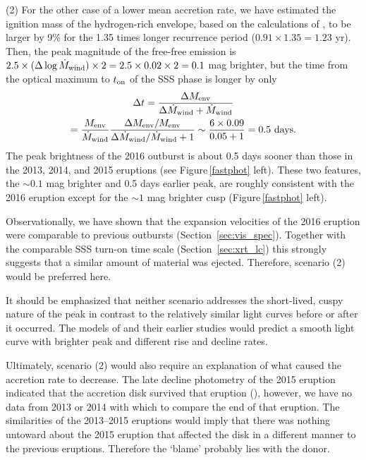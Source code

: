 \documentclass[twocolumn,tighten]{aastex6}
\newcommand{\hstphot}{\citetalias{2017ApJ...849...96D}}
\begin{document}
(2) For the other case of a lower mean accretion rate, we have estimated the ignition mass of the hydrogen-rich envelope, based on the calculations of \citet{2016ApJ...830...40K, 2017ApJ...838..153K}, to be larger by 9\% for the 1.35 times longer recurrence period ($0.91\times 1.35=1.23$ yr). Then, the peak magnitude of the free-free emission is $2.5 \times (\Delta \log \dot M_{\rm wind}) \times 2 = 2.5\times 0.02\times 2 = 0.1$ mag brighter, but the time from the optical maximum to $t_{\rm on}$ of the SSS phase is longer by only
\begin{multline*}
\Delta t = \frac{\Delta M_{\rm env}} { \Delta \dot M_{\rm wind} + \dot M_{\rm wind}}\\
= \frac{M_{\rm env}}{\dot M_{\rm wind}} \frac{\Delta M_{\rm env}/M_{\rm env}}{\Delta \dot M_{\rm wind}/ \dot M_{\rm wind} + 1} \sim \frac{6 \times 0.09}{0.05+1}=0.5 \text{ days}.
\end{multline*}
\noindent The peak brightness of the 2016 outburst is about 0.5 days sooner than those in the 2013, 2014, and 2015 eruptions (see Figure\,\ref{fastphot} left).  These two features, the $\sim 0.1$ mag brighter and 0.5 days earlier peak, are roughly consistent with the 2016 eruption except for the $\sim 1$ mag brighter cusp (Figure\,\ref{fastphot} left).

Observationally, we have shown that the expansion velocities of the 2016 eruption were comparable to previous outbursts (Section~\ref{sec:vis_spec}). Together with the comparable SSS turn-on time scale (Section~\ref{sec:xrt_lc}) this strongly suggests that a similar amount of material was ejected. Therefore, scenario (2) would be preferred here.

It should be emphasized that neither scenario addresses the short-lived, cuspy nature of the peak in contrast to the relatively similar light curves before or after it occurred. The models of \citet{2017ApJ...838..153K} and their earlier studies would predict a smooth light curve with brighter peak and different rise and decline rates.

Ultimately, scenario (2) would also require an explanation of what caused the accretion rate to decrease.  The late decline photometry of the 2015 eruption indicated that the accretion disk survived that eruption (\hstphot), however, we have no data from 2013 or 2014 with which to compare the end of that eruption.  The similarities of the 2013--2015 eruptions would imply that there was nothing untoward about the 2015 eruption that affected the disk in a different manner to the previous eruptions. Therefore the `blame' probably lies with the donor.
\end{document}
